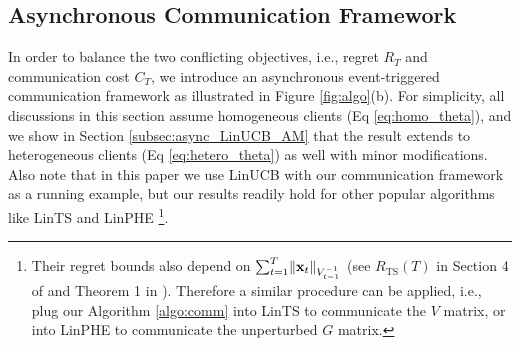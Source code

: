 \subsection{Asynchronous Communication Framework}\label{subsec:async_comm}
In order to balance the two conflicting objectives, i.e., regret $R_{T}$ and communication cost $C_{T}$, we introduce an asynchronous event-triggered communication framework as illustrated in Figure \ref{fig:algo}(b). For simplicity, all discussions in this section assume homogeneous clients (Eq \eqref{eq:homo_theta}), and we show in Section \ref{subsec:async_LinUCB_AM} that the result extends to heterogeneous clients (Eq \eqref{eq:hetero_theta}) as well with minor modifications. Also note that in this paper we use LinUCB \citep{abbasi2011improved} with our communication framework as a running example, but our results readily hold for other popular algorithms like LinTS \citep{abeille2017linear} and LinPHE \citep{kveton2019perturbed}  \footnote{Their regret bounds also depend on $\sum_{t=1}^{T}\lVert \mathbf{x}_{t} \rVert_{V_{t-1}^{-1}}$ (see $R_{\text{TS}}(T)$ in Section 4 of \citet{abeille2017linear} and Theorem 1 in \citet{kveton2019perturbed}). Therefore a similar procedure can be applied, i.e., plug our Algorithm \ref{algo:comm} into LinTS to communicate the $V$ matrix, or into LinPHE to communicate the unperturbed $G$ matrix.}.

